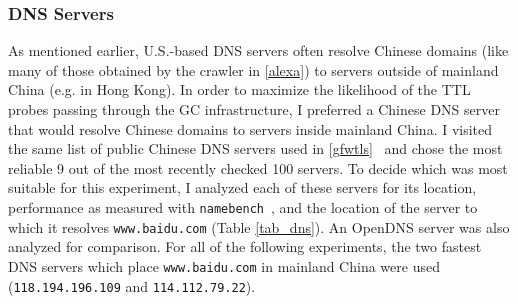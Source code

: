 \subsubsection{DNS Servers}\label{dns}
As mentioned earlier, U.S.-based DNS servers often resolve Chinese domains (like many of those obtained by the crawler in \autoref{alexa}) to servers outside of mainland China (e.g. in Hong Kong).
In order to maximize the likelihood of the TTL probes passing through the GC infrastructure, I preferred a Chinese DNS server that would resolve Chinese domains to servers inside mainland China.
I visited the same list of public Chinese DNS servers used in \autoref{gfwtls}~\cite{PublicDNS} and chose the most reliable 9 out of the most recently checked 100 servers.
To decide which was most suitable for this experiment, I analyzed each of these servers for its location, performance as measured with \texttt{namebench}~\cite{Stromberg2010}, and the location of the server to which it resolves \texttt{www.baidu.com} (Table \ref{tab_dns}).
An OpenDNS server was also analyzed for comparison.
For all of the following experiments, the two fastest DNS servers which place \texttt{www.baidu.com} in mainland China were used (\texttt{118.194.196.109} and \texttt{114.112.79.22}).
